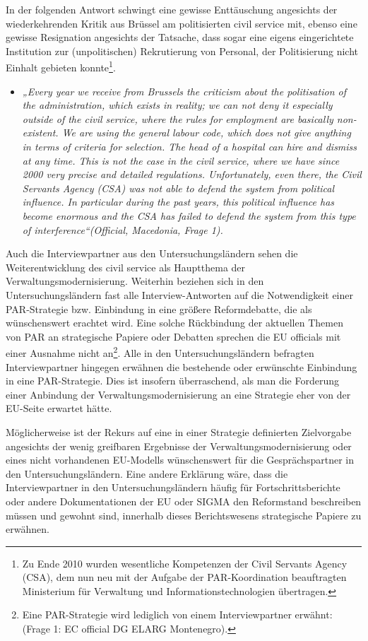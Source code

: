 In der folgenden Antwort schwingt eine gewisse Enttäuschung angesichts der wiederkehrenden Kritik aus Brüssel am politisierten civil service mit, ebenso eine gewisse Resignation angesichts der Tatsache, dass sogar eine eigens eingerichtete Institution zur (unpolitischen) Rekrutierung von Personal, der Politisierung nicht Einhalt gebieten konnte\footnote{Zu Ende 2010 wurden wesentliche Kompetenzen der Civil Servants Agency (CSA), dem nun neu mit der Aufgabe der PAR-Koordination beauftragten Ministerium für Verwaltung und Informationstechnologien übertragen.}. 
\begin{itemize}[label={}]
\item \textit{„Every year we receive from Brussels the criticism about the politisation of the administration, which exists in reality; we can not deny it especially outside of the civil service, where the rules for employment are basically non-existent. We are using the general labour code, which does not give anything in terms of criteria for selection. The head of a hospital can hire and dismiss at any time. This is not the case in the civil service, where we have since 2000 very precise and detailed regulations. Unfortunately, even there, the Civil Servants Agency (CSA) was not able to defend the system from political influence. In particular during the past years, this political influence has become enormous and the CSA has failed to defend the system from this type of interference“(Official, Macedonia, Frage 1).}
\end{itemize}
Auch die Interviewpartner aus den Untersuchungsländern sehen die Weiterentwicklung des civil service als Hauptthema der Verwaltungsmodernisierung. Weiterhin beziehen sich in den Untersuchungsländern fast alle Interview-Antworten auf die Notwendigkeit einer PAR-Strategie bzw. Einbindung in eine größere Reformdebatte, die als wünschenswert erachtet wird. Eine solche Rückbindung der aktuellen Themen von PAR an strategische Papiere oder Debatten sprechen die EU officials mit einer Ausnahme nicht an\footnote{Eine PAR-Strategie wird lediglich von einem Interviewpartner erwähnt: (Frage 1: EC official DG ELARG Montenegro).}. Alle in den Untersuchungsländern befragten Interviewpartner hingegen erwähnen die bestehende oder erwünschte Einbindung in eine PAR-Strategie. Dies ist insofern überraschend, als man die Forderung einer Anbindung der Verwaltungsmodernisierung an eine Strategie eher von der EU-Seite erwartet hätte.\par
Möglicherweise ist der Rekurs auf eine in einer Strategie definierten Zielvorgabe angesichts der wenig greifbaren Ergebnisse der Verwaltungsmodernisierung oder eines nicht vorhandenen EU-Modells wünschenswert für die Gesprächspartner in den Untersuchungsländern. Eine andere Erklärung wäre, dass die Interviewpartner in den Untersuchungsländern häufig für Fortschrittsberichte oder andere Dokumentationen der EU oder SIGMA den Reformstand beschreiben müssen und gewohnt sind, innerhalb dieses Berichtswesens strategische Papiere zu erwähnen.\par
